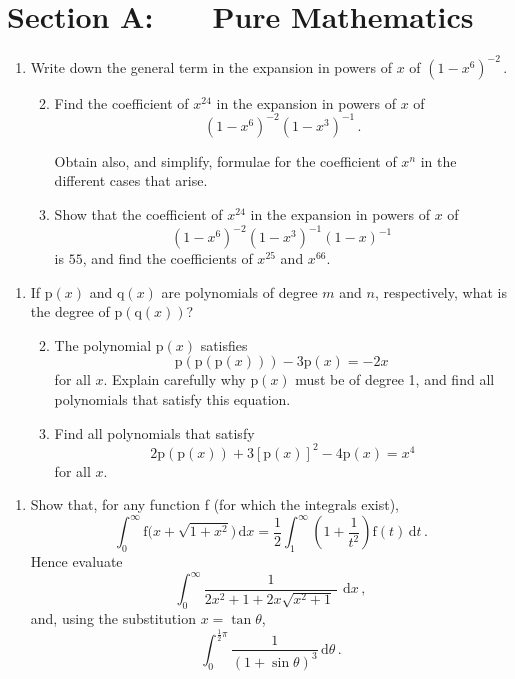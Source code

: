 \documentclass[a4, 11pt]{report}
\newlength{\qspace}
\newcounter{qnumber}
\newenvironment{question}%
 {\vspace{\qspace}
  \begin{enumerate}[\bfseries 1\quad][10]%
    \setcounter{enumi}{\value{qnumber}}%
    \item%
 }
{
  \end{enumerate}
  \filbreak
  \stepcounter{qnumber}
 }
\newenvironment{questionparts}[1][1]%
 {
  \begin{enumerate}[\bfseries (i)]%
    \setcounter{enumii}{#1}
    \addtocounter{enumii}{-1}
    \setlength{\itemsep}{5mm}
    \setlength{\parskip}{8pt}
 }
 {
  \end{enumerate}
 }
\def\d{{\mathrm d}}
\def\f{{\mathrm f}}
\def\p{{\mathrm p}}
\def\q{{\mathrm q}}
\begin{document}
\setcounter{page}{2}

 
\section*{Section A: \ \ \ Pure Mathematics}

\begin{question}
Write down the general term in the expansion in powers of 
$x$ of 
$(1-x^6)^{-2}\,$.
\begin{questionparts}
\item
Find      the coefficient of $x^{24}$ in 
the expansion in powers of $x$ of 
\[
(1-x^6)^{-2} (1-x^3)^{-1}\,.\]



Obtain also, and simplify, formulae for the 
coefficient of $x^n$ in the different
cases that arise.

\item Show that the coefficient of $x^{24}$ 
in the expansion in powers of $x$ of
\[ 
(1-x^6)^{-2} (1-x^3)^{-1} (1-x)^{-1}\,\] is $55$,
and find the coefficients of 
$x^{25}$ and $x^{66}$.




\end{questionparts}
\end{question}

\begin{question}
If $\p(x)$ and $\q(x)$ are polynomials of degree $m$ and $n$,
respectively, what is the degree of $\p(\q(x))$?

\begin{questionparts}
\item
The polynomial $\p(x)$ satisfies
\[
\p(\p(\p(x)))- 3 \p(x)= -2x\,
\]
for all $x$.
Explain carefully why $\p(x)$ must be of degree 1, and 
find all polynomials that satisfy this equation.

\item 
Find all polynomials that satisfy
\[
2\p(\p(x)) +3 [\p(x)]^2 -4\p(x) =x^4
\]   
for all $x$. 
\end{questionparts}
\end{question}

\begin{question}
Show that, for any function f (for which the integrals exist),
\[
\int_0^\infty \f\big(x+\sqrt{1+x^2}\big) \,\d x = \frac12 \int_1^\infty
\left(1+\frac 1 {t^2}\right) \f(t)\, \d t \,.
\] 
Hence 
evaluate
\[
\int_0^\infty \frac1 {2x^2 +1 + 2 x\sqrt{x^2+1} \ } \, \, \d x
\,,
\]
and, using the substitution $x=\tan\theta$,
\[
\int_0^{\frac12\pi} \frac{1}{(1+\sin\theta)^3}\,\d \theta
\,.
\] 
\end{question}
\end{document}

